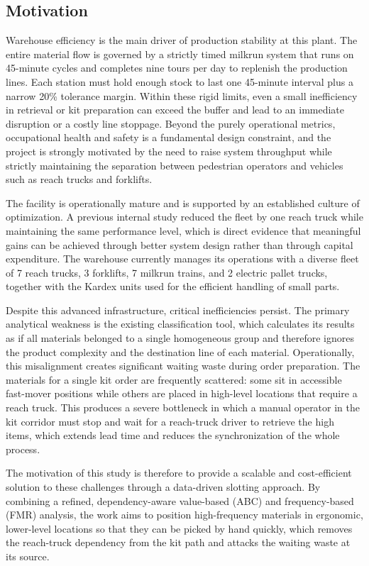 \documentclass[12pt,a4paper]{article}
\begin{document}
\subsection{Motivation}
Warehouse efficiency is the main driver of production stability at this plant.
The entire material flow is governed by a strictly timed milkrun system that
runs on 45-minute cycles and completes nine tours per day to replenish the
production lines. Each station must hold enough stock to last one 45-minute
interval plus a narrow 20\% tolerance margin. Within these rigid limits, even
a small inefficiency in retrieval or kit preparation can exceed the buffer and
lead to an immediate disruption or a costly line stoppage. Beyond the purely
operational metrics, occupational health and safety is a fundamental design
constraint, and the project is strongly motivated by the need to raise system
throughput while strictly maintaining the separation between pedestrian
operators and vehicles such as reach trucks and forklifts.

The facility is operationally mature and is supported by an established culture
of optimization. A previous internal study reduced the fleet by one reach
truck while maintaining the same performance level, which is direct evidence
that meaningful gains can be achieved through better system design rather than
through capital expenditure. The warehouse currently manages its operations
with a diverse fleet of 7 reach trucks, 3 forklifts, 7 milkrun trains, and 2
electric pallet trucks, together with the Kardex units used for the efficient
handling of small parts.

Despite this advanced infrastructure, critical inefficiencies persist. The
primary analytical weakness is the existing classification tool, which
calculates its results as if all materials belonged to a single homogeneous
group and therefore ignores the product complexity and the destination line of
each material. Operationally, this misalignment creates significant waiting
waste during order preparation. The materials for a single kit order are
frequently scattered: some sit in accessible fast-mover positions while others
are placed in high-level locations that require a reach truck. This produces a
severe bottleneck in which a manual operator in the kit corridor must stop and
wait for a reach-truck driver to retrieve the high items, which extends lead
time and reduces the synchronization of the whole process.

The motivation of this study is therefore to provide a scalable and
cost-efficient solution to these challenges through a data-driven slotting
approach. By combining a refined, dependency-aware value-based (ABC) and
frequency-based (FMR) analysis, the work aims to position high-frequency
materials in ergonomic, lower-level locations so that they can be picked by
hand quickly, which removes the reach-truck dependency from the kit path and
attacks the waiting waste at its source.
\end{document}
